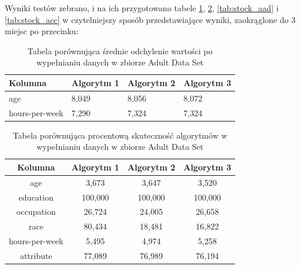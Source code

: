 \documentclass[12pt,twoside]{article}
\begin{document}
Wyniki testów zebrano, i na ich przygotowano tabele \ref{tab:adult_aad}, \ref{tab:adult_acc},
\ref{tab:stock_aad} i \ref{tab:stock_acc} w czytelniejszy sposób przedstawiające wyniki, zaokrąglone do 3 miejsc po przecinku:

\begin{table}[ht]
    \caption{Tabela porównująca średnie odchylenie wartości po wypełnianiu danych w zbiorze Adult Data Set}
    \centering
    \begin{tabular}{|l|l|l|l|}
        \hline
        \textbf{Kolumna} & \textbf{Algorytm 1} & \textbf{Algorytm 2} & \textbf{Algorytm 3} \\ \hline
        age              & 8,049               & 8,056               & 8,072               \\ \hline
        hours-per-week   & 7,290               & 7,324               & 7,324               \\ \hline
    \end{tabular}
    \label{tab:adult_aad}
\end{table}
\FloatBarrier

\begin{table}[ht]
    \caption{Tabela porównująca procentową skuteczność algorytmów w wypełnianiu danych w zbiorze Adult Data Set}
    \centering
    \begin{tabular}{|c|c|c|c|}
        \hline
        \textbf{Kolumna} & \textbf{Algorytm 1} & \textbf{Algorytm 2} & \textbf{Algorytm 3} \\ \hline
        age              & 3,673               & 3,647               & 3,520               \\ \hline
        education        & 100,000             & 100,000             & 100,000             \\ \hline
        occupation       & 26,724              & 24,005              & 26,658              \\ \hline
        race             & 80,434              & 18,481              & 16,822              \\ \hline
        hours-per-week   & 5,495               & 4,974               & 5,258               \\ \hline
        attribute        & 77,089              & 76,989              & 76,194              \\ \hline
    \end{tabular}
    \label{tab:adult_acc}
\end{table}
\FloatBarrier
\end{document}
